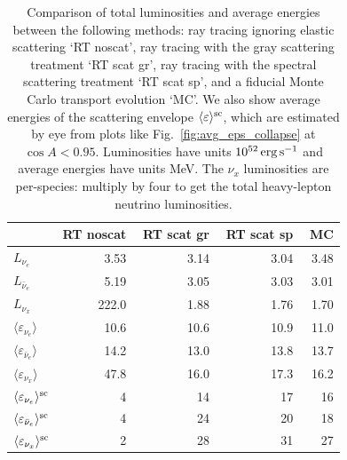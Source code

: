 \documentclass[aps,floatfix,prd,superscriptaddress,twocolumn]{revtex4-1}
\begin{document}
\begin{table}%
  \caption{
    Comparison of total luminosities and average energies between
    the following methods:
    ray tracing ignoring elastic scattering `RT noscat',
    ray tracing with the gray scattering treatment `RT scat gr',
    ray tracing with the spectral scattering treatment `RT scat sp', and
    a fiducial Monte Carlo transport evolution `MC'.
    We also show average energies of the scattering envelope
    $\langle\varepsilon\rangle^{\rm sc}$, which are estimated by eye
    from plots like Fig.~\ref{fig:avg_eps_collapse} at $\cos A < 0.95$.
    Luminosities have units $10^{52}\,{\rm erg}\,{\rm s}^{-1}$ and
    average energies have units MeV.
    The $\nu_x$ luminosities are per-species:
    multiply by four to get the total heavy-lepton neutrino luminosities.
  }
  \label{tab:collapse_rt_vs_mc}
  \begin{tabularx}{\columnwidth}{X r r r r}
    & {\bf RT noscat} & \,\,{\bf RT scat gr} & \,\,{\bf RT scat sp} & \,\,{\bf MC} \\
    \hline
    $L_{\nu_e}$                                         &  3.53 & 3.14 & 3.04 & 3.48 \\
    $L_{\bar{\nu}_e}$                                   & 5.19 & 3.05 & 3.03 & 3.01 \\
    $L_{\nu_x}$                                         & 222.0  & 1.88 & 1.76 & 1.70 \\
    $\langle \varepsilon_{\nu_e} \rangle$               &  10.6 & 10.6 & 10.9 & 11.0 \\
    $\langle \varepsilon_{\bar{\nu}_e} \rangle$         & 14.2 & 13.0 & 13.8 & 13.7 \\
    $\langle \varepsilon_{\nu_x} \rangle$               & 47.8 & 16.0 & 17.3 & 16.2 \\
    $\langle \varepsilon_{\nu_e} \rangle^{\rm sc}$      & 4    & 14   & 17   & 16 \\
    $\langle \varepsilon_{\bar{\nu}_e} \rangle^{\rm sc}$& 4    & 24   & 20   & 18 \\
    $\langle \varepsilon_{\nu_x} \rangle^{\rm sc}$      & 2    & 28   & 31   & 27 \\
    \hline
  \end{tabularx}
\end{table}
\end{document}
